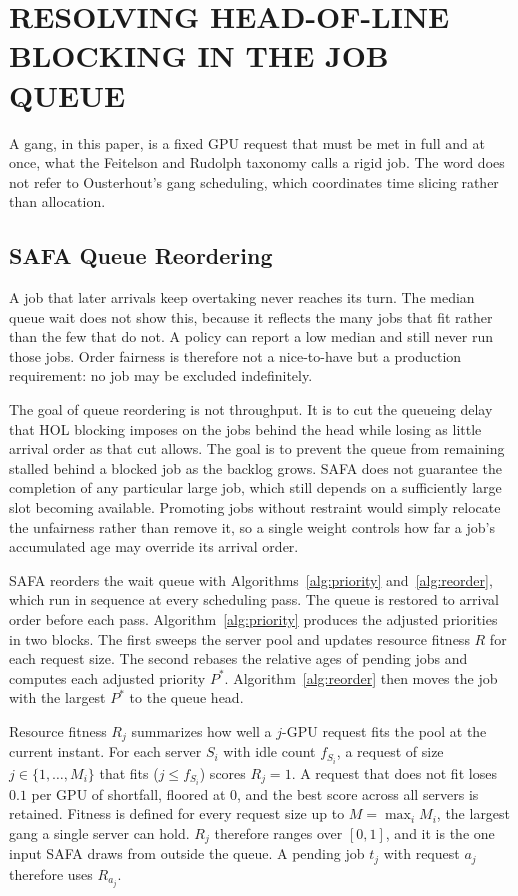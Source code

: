\documentclass{ieeetj}
\begin{document}
\section{RESOLVING HEAD-OF-LINE BLOCKING IN THE JOB QUEUE}\label{algo:intro}
A gang, in this paper, is a fixed GPU request that must be met in full and at once, what the Feitelson and Rudolph taxonomy\cite{feitelson1996toward} calls a rigid job. The word does not refer to Ousterhout's gang scheduling\cite{ousterhout1982gang}, which coordinates time slicing rather than allocation.

\subsection{SAFA Queue Reordering}
A job that later arrivals keep overtaking never reaches its turn. The median queue wait does not show this, because it reflects the many jobs that fit rather than the few that do not. A policy can report a low median and still never run those jobs. Order fairness is therefore not a nice-to-have but a production requirement: no job may be excluded indefinitely.

The goal of queue reordering is not throughput. It is to cut the queueing delay that HOL blocking imposes on the jobs behind the head while losing as little arrival order as that cut allows. The goal is to prevent the queue from remaining stalled behind a blocked job as the backlog grows. SAFA does not guarantee the completion of any particular large job, which still depends on a sufficiently large slot becoming available. Promoting jobs without restraint would simply relocate the unfairness rather than remove it, so a single weight controls how far a job's accumulated age may override its arrival order.

SAFA reorders the wait queue with Algorithms~\ref{alg:priority} and~\ref{alg:reorder}, which run in sequence at every scheduling pass. The queue is restored to arrival order before each pass. Algorithm~\ref{alg:priority} produces the adjusted priorities in two blocks. The first sweeps the server pool and updates resource fitness $R$ for each request size. The second rebases the relative ages of pending jobs and computes each adjusted priority $P^*$. Algorithm~\ref{alg:reorder} then moves the job with the largest $P^*$ to the queue head.

Resource fitness $R_j$ summarizes how well a $j$-GPU request fits the pool at the current instant. For each server $S_i$ with idle count $f_{S_i}$, a request of size $j\in\{1,\dots,M_i\}$ that fits ($j\le f_{S_i}$) scores $R_j=1$. A request that does not fit loses $0.1$ per GPU of shortfall, floored at 0, and the best score across all servers is retained. Fitness is defined for every request size up to $M=\max_i M_i$, the largest gang a single server can hold. $R_j$ therefore ranges over $[0,1]$, and it is the one input SAFA draws from outside the queue. A pending job $t_j$ with request $a_j$ therefore uses $R_{a_j}$.
\end{document}
